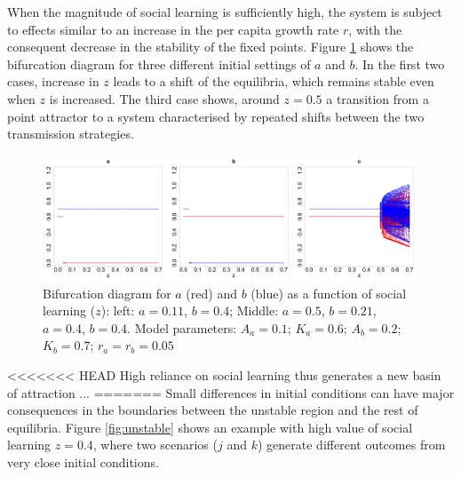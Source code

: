 \documentclass[3p,authoryear,twocolumn]{elsarticle} %
\begin{document}
When the magnitude of social learning is sufficiently high, the system is subject to effects similar to an increase in the per capita growth rate $r$, with the consequent decrease in the stability of the fixed points. Figure \ref{fig:bifurcationWithTransmission} shows the bifurcation diagram for three different initial settings of $a$ and $b$. In the first two cases, increase in $z$ leads to a shift of the equilibria, which remains stable even when $z$ is increased. The third case shows, around $z=0.5$ a transition from a point attractor to a system characterised by repeated shifts between the two transmission strategies. 

\begin{figure}
  \centering
      \includegraphics[width=1\textwidth]{./figures/figure4.jpg}
  \caption{Bifurcation diagram for $a$ (red) and $b$ (blue) as a function of social learning ($z$): left: $a=0.11$, $b=0.4$; Middle: $a=0.5$, $b=0.21$, $a=0.4$, $b=0.4$. Model parameters:  $A_a=0.1$; $K_a=0.6$; $A_b=0.2$; $K_b=0.7$; $r_a=r_b=0.05$}
    \label{fig:bifurcationWithTransmission}
\end{figure}

<<<<<<< HEAD
High reliance on social learning thus generates a new basin of attraction ... %
=======
Small differences in initial conditions can have major consequences in the boundaries between the unstable region and the rest of equilibria. Figure \ref{fig:unstable} shows an example with high value of social learning $z=0.4$, where two scenarios ($j$ and $k$) generate different outcomes from very close initial conditions.
\end{document}
